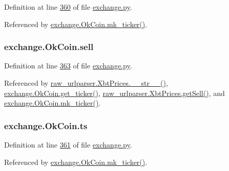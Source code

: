 Definition at line \hyperlink{exchange_8py_source_l00360}{360} of file \hyperlink{exchange_8py_source}{exchange.\+py}.



Referenced by \hyperlink{exchange_8py_source_l00385}{exchange.\+Ok\+Coin.\+mk\+\_\+ticker()}.

\subsubsection[{\texorpdfstring{sell}{sell}}]{\setlength{\rightskip}{0pt plus 5cm}exchange.\+Ok\+Coin.\+sell}\hypertarget{classexchange_1_1_ok_coin_aadb487d2e2f277374a747e1bcb0bd40b}{}\label{classexchange_1_1_ok_coin_aadb487d2e2f277374a747e1bcb0bd40b}


Definition at line \hyperlink{exchange_8py_source_l00363}{363} of file \hyperlink{exchange_8py_source}{exchange.\+py}.



Referenced by \hyperlink{raw__urlparser_8py_source_l00074}{raw\+\_\+urlparser.\+Xbt\+Prices.\+\_\+\+\_\+str\+\_\+\+\_\+()}, \hyperlink{exchange_8py_source_l00371}{exchange.\+Ok\+Coin.\+get\+\_\+ticker()}, \hyperlink{raw__urlparser_8py_source_l00065}{raw\+\_\+urlparser.\+Xbt\+Prices.\+get\+Sell()}, and \hyperlink{exchange_8py_source_l00385}{exchange.\+Ok\+Coin.\+mk\+\_\+ticker()}.

\subsubsection[{\texorpdfstring{ts}{ts}}]{\setlength{\rightskip}{0pt plus 5cm}exchange.\+Ok\+Coin.\+ts}\hypertarget{classexchange_1_1_ok_coin_a0fe6263a7f58a6fa8a688929976b7e4a}{}\label{classexchange_1_1_ok_coin_a0fe6263a7f58a6fa8a688929976b7e4a}


Definition at line \hyperlink{exchange_8py_source_l00361}{361} of file \hyperlink{exchange_8py_source}{exchange.\+py}.



Referenced by \hyperlink{exchange_8py_source_l00385}{exchange.\+Ok\+Coin.\+mk\+\_\+ticker()}.

